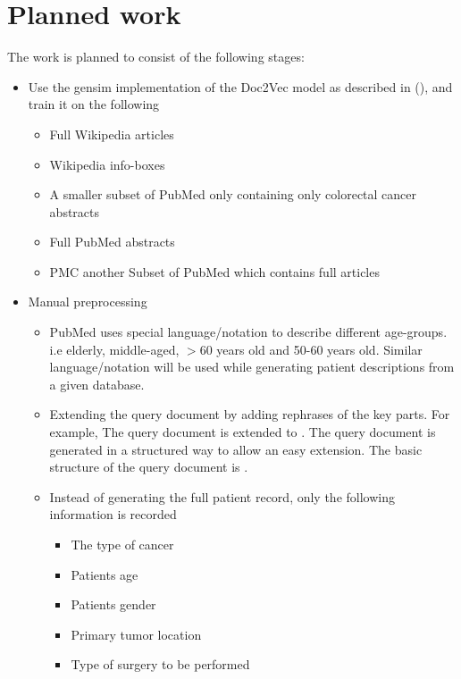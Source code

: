 \documentclass[12pt,a4paper] {article}
\begin{document}
	\section*{Planned work} 
	The work is planned to consist of the following stages:
	\begin{itemize}
		\item Use the gensim \cite{rehurek_lrec} implementation of the Doc2Vec model as described in (\cite{le2014distributed}), and train it on
		the following
		\begin{itemize}
			\item Full Wikipedia articles 
			\item Wikipedia info-boxes
			\item A smaller subset of PubMed only containing only  colorectal cancer abstracts
			\item Full PubMed abstracts
			\item PMC another Subset of PubMed which contains full articles
		\end{itemize}
		
		
		\item Manual preprocessing
		\begin{itemize}
			\item PubMed uses special language/notation to describe different age-groups. i.e elderly, middle-aged, $>$60 years old and 50-60 years old. Similar language/notation will be used while generating patient descriptions from a given database.
			
			\item Extending the query document by adding rephrases of the key parts. For example, The query document  is extended to . The query document is generated in a structured way to allow an easy extension. The basic structure of the query document is .
			 
			\item Instead of generating the full patient record, only the following information is recorded
			\begin{itemize}
				\item The type of cancer
				\item Patients age
				\item Patients gender
				\item Primary tumor location
				\item Type of surgery to be performed
				

\end{itemize}
\end{itemize}
\end{itemize}
\end{document}

